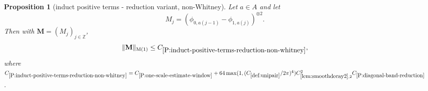 \documentclass[12pt,reqno]{amsart}
\theoremstyle{plain}
\newtheorem{proposition}[theorem]{Proposition}
\numberwithin{equation}{section}
\theoremstyle{remark}
\newcommand{\uses}[1]{}
\newcommand{\usesdefs}[1]{}
\newcommand{\Z}{{\mathbb Z}}
\newcommand{\M}{\mathbf{M}}
\begin{document}
\begin{proposition}[induct positive terms - reduction variant, non-Whitney]
\label{P:induct-positive-terms-reduction-non-whitney}\uses{P:one-scale-estimate-window,L:fourier-transform-window,Operations on spaced sequences,lem:smoothdecay2,lem:scaleest,P:vanishing-diagonal-reduction,P:diagonal-band-reduction}\usesdefs{bracket bump,multiplicatively spaced monotone sequences,auto:unitary-matrices-definition,kernel sequences,def:cn-window,def:unipair}
Let $a\in A$ and let
\begin{equation}\label{auto:non-Whitney-kernel}M_j=({\phi}_{0,a(j-1)}-{\phi}_{1,a(j)})^{\otimes 2}.\end{equation}
Then with $\M=(M_j)_{j\in \Z}$,  \begin{equation}\label{auto:non-Whitney-reduction-bound}\|\M\|_{\rm M(1)}\le C_{\ref{P:induct-positive-terms-reduction-non-whitney}},\end{equation}
where $C_{\ref{P:induct-positive-terms-reduction-non-whitney}}=C_{\ref{P:one-scale-estimate-window}}+ 64 \max(1,(C_{\ref{def:unipair}}/2\pi)^4) C_{\ref{lem:smoothdecay2},2}^2C_{\ref{P:diagonal-band-reduction}}$.
\end{proposition}
\end{document}
